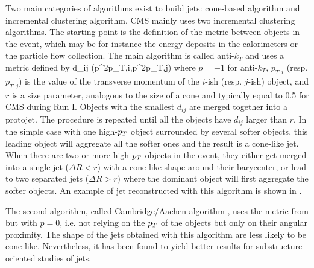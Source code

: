     Two main categories of algorithms exist to build jets: cone-based algorithm and
    incremental clustering algorithm. CMS mainly uses two incremental clustering
    algorithms. The starting point is the definition of the metric between objects in the
    event, which may be for instance the energy deposits in the calorimeters or the
    particle flow collection. The main algorithm is called anti-$k_T$ \cite{antiKt} and uses a metric
    defined by
    {
        d_{ij}  {}(p^{2p}_{T,i},p^{2p}_{T,j}) 
    }
    where $p = -1$ for anti-$k_T$, $p_{T,i}$ (resp. $p_{T,j}$) is the value of the transverse momentum of
    the $i$-ish (resp. $j$-ish) object, and $r$ is a size parameter, analogous to the size of a cone and
    typically equal to 0.5 for CMS during Run I. Objects with the smallest $d_{ij}$ are
    merged together into a protojet. The procedure is repeated until all the objects have
    $d_{ij}$ larger than $r$. In the
    simple case with one high-$p_T$ object surrounded by several softer objects, this
    leading object will aggregate all the softer ones and the result is a cone-like jet. When
    there are two or more high-$p_T$ objects in the event, they either get merged into
    a single jet ($\Delta R < r$) with a cone-like shape around their barycenter, or
    lead to two separated jets ($\Delta R > r$) where the dominant object will first
    aggregate the softer objects. An example of jet reconstructed with this algorithm
    is shown in .

    The second algorithm, called Cambridge/Aachen algorithm \cite{CA}, uses the metric from
     but with $p = 0$, i.e. not relying on the $p_T$ of
    the objects but only on their angular proximity. The shape of the jets obtained with
    this algorithm are less likely to be cone-like. Nevertheless, it has been found to
    yield better results for substructure-oriented studies of jets.


